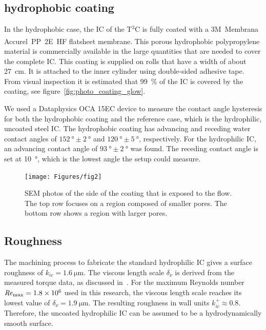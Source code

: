 \subsection{{hydrophobic} coating}
In the {hydrophobic} case, the IC of the T$^3$C is fully coated with a 3M~Membrana Accurel\textsuperscript{\textregistered}~PP~2E~HF flatsheet membrane. This porous hydrophobic polypropylene material is commercially available in the large quantities that are needed to cover the complete IC.
This coating is supplied on rolls that have a width of about \SI{27}{\cm}. It is attached to the inner cylinder using double-sided adhesive tape. From visual inspection it is estimated that \SI{99}{\percent} of the IC is covered by the coating, see figure~\ref{fig:photo_coating_glow}.

We used a Dataphysics OCA 15EC device to measure the contact angle hysteresis for both the {hydrophobic} coating and the reference case, which is the hydrophilic, uncoated steel IC. The {hydrophobic} coating has advancing and receding water contact angles of $\SI{152}{\degree} \pm \SI{2}{\degree}$ and $\SI{120}{\degree} \pm \SI{5}{\degree}$, respectively. For the hydrophilic IC, an advancing contact angle of $\SI{93}{\degree} \pm \SI{2}{\degree}$ was found. The receding contact angle is set at \SI{10}{\degree}, which is the lowest angle the setup could measure.

\begin{figure}
\centering
\texttt{[image: Figures/fig2]}
\caption{SEM photos of the side of the coating that is exposed to the flow. The top row focuses on a region composed of smaller pores. The bottom row shows a region with larger pores.}\label{fig:SEM-bottom}
\end{figure}

\subsection{Roughness}
The machining process to fabricate the standard hydrophilic IC gives a surface roughness of $k_{ic} = \SI{1.6}{\um}$. The viscous length scale $\delta_\nu$ is derived from the measured torque data, as discussed in~\citep{hui13}. For the maximum Reynolds number $\mbox{\textit{Re}}_\text{max} = 1.8 \times 10^6$ used in this research, the viscous length scale reaches its lowest value of $\delta_\nu = \SI{1.9}{\um}$. The resulting roughness in wall units $k^+_{ic} \approx 0.8$. Therefore, the uncoated hydrophilic IC can be assumed to be a hydrodynamically smooth surface.

